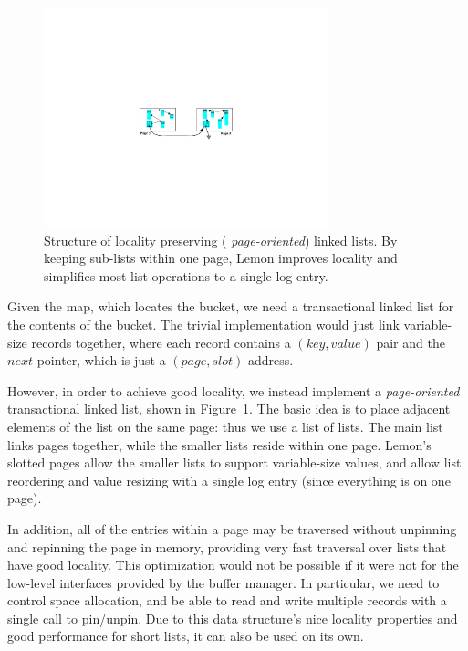 \documentclass[10pt,letterpaper,twocolumn,english]{article}
\newcommand{\yad}{Lemon\xspace}
\begin{document}
\begin{figure}
\hspace{.25in}
\includegraphics[width=3.25in]{LHT2.pdf}
\caption{\sf\label{fig:LHT}Structure of locality preserving ({\em
page-oriented}) linked lists. By keeping sub-lists within one page,
\yad improves locality and simplifies most list operations to a single
log entry.}
\end{figure}

Given the map, which locates the bucket, we need a transactional
linked list for the contents of the bucket.  The trivial implementation
would just link variable-size records together, where each record
contains a $(key,value)$ pair and the $next$ pointer, which is just a
$(page,slot)$ address.

However, in order to achieve good locality, we instead implement a
{\em page-oriented} transactional linked list, shown in
Figure~\ref{fig:LHT}.  The basic idea is to place adjacent elements of
the list on the same page: thus we use a list of lists. The main list
links pages together, while the smaller lists reside within one
page. \yad's slotted pages allow the smaller lists to support
variable-size values, and allow list reordering and value resizing
with a single log entry (since everything is on one page).

In addition, all of the entries within a page may be traversed without
unpinning and repinning the page in memory, providing very fast
traversal over lists that have good locality.  This optimization would
not be possible if it were not for the low-level interfaces provided
by the buffer manager.  In particular, we need to control space
allocation, and be able to read and write multiple records with a
single call to pin/unpin.  Due to this data structure's nice locality
properties and good performance for short lists, it can also be used
on its own.
\end{document}
